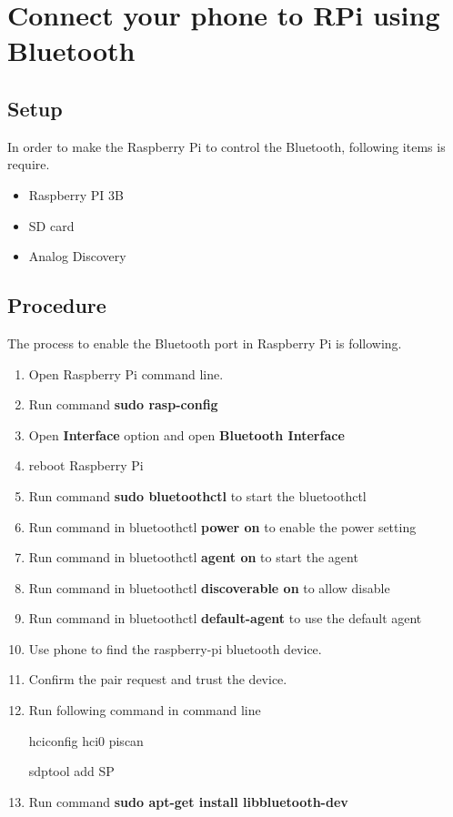 \documentclass{article}
\begin{document}
\section{Connect your phone to RPi using Bluetooth}
\subsection{Setup}
In order to make the Raspberry Pi to control the Bluetooth, following items is require.
\begin{itemize}
	\item Raspberry PI 3B
	\item SD card
	\item Analog Discovery
\end{itemize}
\subsection{Procedure}
The process to enable the Bluetooth port in Raspberry Pi is following.
\begin{enumerate}[1)]
	\item Open Raspberry Pi command line.
	\item Run command \textbf{sudo rasp-config}
	\item Open \textbf{Interface} option and open \textbf{Bluetooth Interface}
	\item reboot Raspberry Pi
	\item Run command \textbf{sudo bluetoothctl} to start the bluetoothctl
	\item Run command in bluetoothctl \textbf{power on} to enable the power setting
	\item Run command in bluetoothctl \textbf{agent on} to start the agent
	\item Run command in bluetoothctl \textbf{discoverable on} to allow disable
	\item Run command in bluetoothctl \textbf{default-agent} to use the default agent
	\item Use phone to find the raspberry-pi bluetooth device.
	\item Confirm the pair request and trust the device.
	\item Run following command in command line
	\begin{center}
		hciconfig hci0 piscan
	\end{center}
	\begin{center}
		sdptool add SP
	\end{center}
	\item Run command \textbf{sudo apt-get install libbluetooth-dev}
\end{enumerate}
\end{document}
